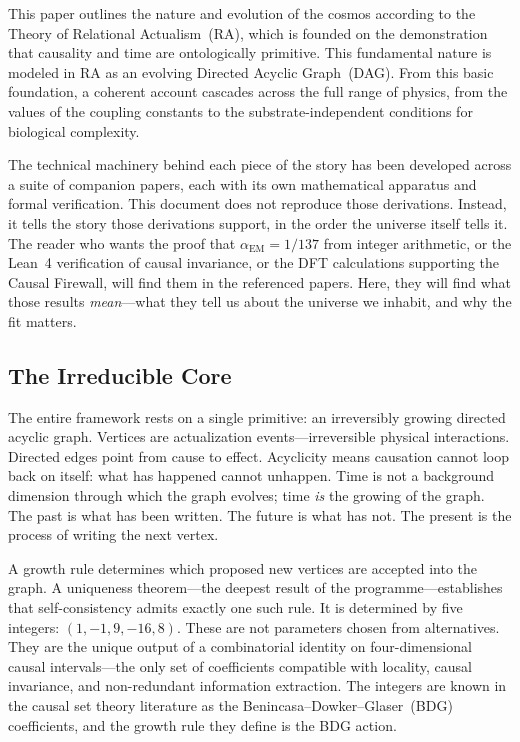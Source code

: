 \documentclass[12pt,a4paper]{article}
\begin{document}
This paper outlines the nature and evolution of the cosmos according to the Theory of Relational Actualism~(RA), which is founded on the demonstration that causality and time are ontologically primitive. This fundamental nature is modeled in RA as an evolving Directed Acyclic Graph~(DAG). From this basic foundation, a coherent account cascades across the full range of physics, from the values of the coupling constants to the substrate-independent conditions for biological complexity.

The technical machinery behind each piece of the story has been developed across a suite of companion papers, each with its own mathematical apparatus and formal verification. This document does not reproduce those derivations. Instead, it tells the story those derivations support, in the order the universe itself tells it. The reader who wants the proof that $\alpha_{\mathrm{EM}} = 1/137$ from integer arithmetic, or the Lean~4 verification of causal invariance, or the DFT calculations supporting the Causal Firewall, will find them in the referenced papers. Here, they will find what those results \emph{mean}---what they tell us about the universe we inhabit, and why the fit matters.

\subsection{The Irreducible Core}

The entire framework rests on a single primitive: an irreversibly growing directed acyclic graph. Vertices are actualization events---irreversible physical interactions. Directed edges point from cause to effect. Acyclicity means causation cannot loop back on itself: what has happened cannot unhappen. Time is not a background dimension through which the graph evolves; time \emph{is} the growing of the graph. The past is what has been written. The future is what has not. The present is the process of writing the next vertex.

A growth rule determines which proposed new vertices are accepted into the graph. A uniqueness theorem---the deepest result of the programme---establishes that self-consistency admits exactly one such rule. It is determined by five integers: $(1, -1, 9, -16, 8)$. These are not parameters chosen from alternatives. They are the unique output of a combinatorial identity on four-dimensional causal intervals---the only set of coefficients compatible with locality, causal invariance, and non-redundant information extraction. The integers are known in the causal set theory literature as the Benincasa--Dowker--Glaser~(BDG) coefficients, and the growth rule they define is the BDG action.
\end{document}
